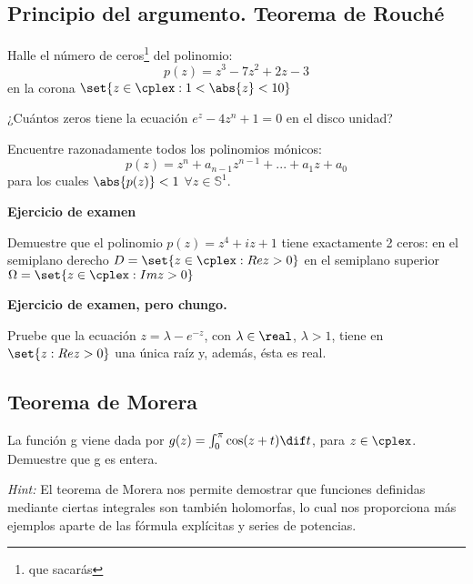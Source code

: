 \subsection{Principio del argumento. Teorema de Rouché}
\begin{problem}
Halle el número de ceros\footnote{que sacarás} del polinomio:
\[ p(z) = z^3 - 7z^2 + 2z - 3 \]
en la corona $\set{z \in \cplex: 1 < \abs{z} < 10 }$
\solution

\end{problem}

\begin{problem}

¿Cuántos zeros tiene la ecuación $e^z - 4 z^n + 1 = 0$ en el disco unidad?
\solution

\end{problem}

\begin{problem}
Encuentre razonadamente todos los polinomios mónicos:
\[ p(z) = z^n + a_{n-1} z^{n-1} + ... + a_1 z + a_0 \]
para los cuales $\abs{p(z)} < 1$ $\forall z \in \mathbb{S}^1$.
\solution

\end{problem}

\begin{problem} {\bf Ejercicio de examen}

Demuestre que el polinomio $p(z) = z^4 + iz + 1$ tiene exactamente 2 ceros:
\ppart en el semiplano derecho $D = \set{z \in \cplex : Re z > 0}$
\ppart en el semiplano superior $\Omega = \set{z \in \cplex : Im z > 0}$
\solution

\end{problem}

\begin{problem} {\bf Ejercicio de examen, pero chungo.}

Pruebe que la ecuación $z = \lambda - e^{-z}$, con $\lambda \in \real$, $\lambda > 1$, tiene en $\set{z : Re z > 0} $ una única raíz y, además, ésta es real.
\solution

\end{problem}

\subsection{Teorema de Morera}
\begin{problem}

La función g viene dada por $g(z) = \int_{0}^{\pi} \cos(z + t) \dif t$, para $z \in \cplex$. Demuestre que g es entera.

{\it Hint:} El teorema de Morera nos permite demostrar que funciones definidas mediante ciertas integrales son también holomorfas, lo cual nos proporciona más ejemplos aparte de las fórmula explícitas y series de potencias.
\solution

\end{problem}

